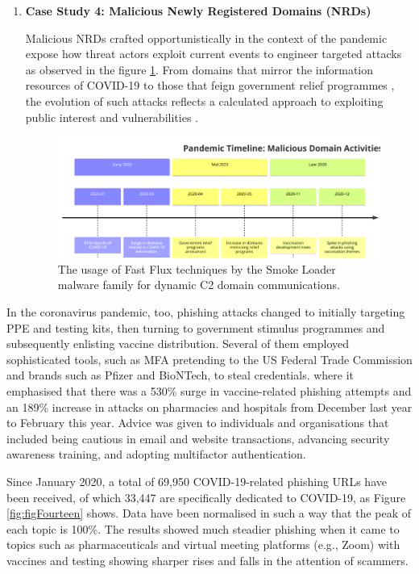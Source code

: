 \begin{enumerate}
\item\textbf{Case Study 4:  Malicious Newly Registered Domains (NRDs)}

Malicious NRDs crafted opportunistically in the context of the pandemic expose how threat actors exploit current events to engineer targeted attacks as observed in the figure \ref{fig:figThirteen}. From domains that mirror the information resources of COVID-19 to those that feign government relief programmes \cite{paloaltonetworks2021dnsattacks}, the evolution of such attacks reflects a calculated approach to exploiting public interest and vulnerabilities  \cite{unit42_covid19_phishing_2021} .

\captionsetup{font= footnotesize}
\begin{figure}[H]
    \centering
    \includegraphics[width=0.6\linewidth]{background/PandemicTime.png}
    \caption{The usage of Fast Flux techniques by the Smoke Loader malware family for dynamic C2 domain communications.}
    \label{fig:figThirteen}
\end{figure}

\end{enumerate}

In the coronavirus pandemic, too, phishing attacks changed to initially targeting PPE and testing kits, then turning to government stimulus programmes and subsequently enlisting vaccine distribution. Several of them employed sophisticated tools, such as MFA pretending to the US Federal Trade Commission and brands such as Pfizer and BioNTech, to steal credentials. where it emphasised that there was a 530\% surge in vaccine-related phishing attempts and an 189\% increase in attacks on pharmacies and hospitals from December last year to February this year. Advice was given to individuals and organisations that included being cautious in email and website transactions, advancing security awareness training, and adopting multifactor authentication.

Since January 2020, a total of 69,950 COVID-19-related phishing URLs have been received, of which 33,447 are specifically dedicated to COVID-19, as Figure \ref{fig:figFourteen} shows. Data have been normalised in such a way that the peak of each topic is 100\%. The results showed much steadier phishing when it came to topics such as pharmaceuticals and virtual meeting platforms (e.g., Zoom) with vaccines and testing showing sharper rises and falls in the attention of scammers.

